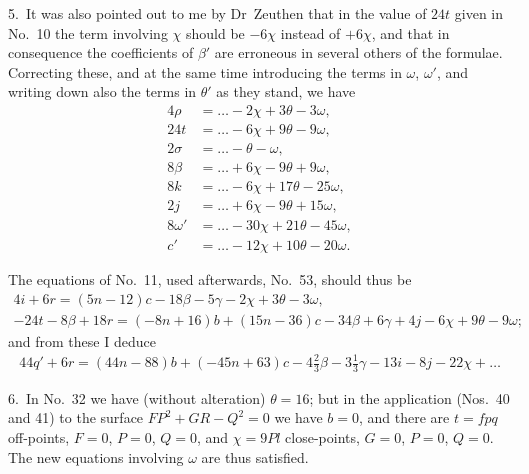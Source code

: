 \documentclass[11pt,a4paper]{article}
\theoremstyle{plain}
\theoremstyle{definition}
\theoremstyle{remark}
\begin{document}
5.\ It was also pointed out to me by Dr~Zeuthen that in the value of $24t$ given in No.~10 the term involving $\chi$ should be $-6\chi$ instead of $+6\chi$, and that in consequence the coefficients of $\beta'$ are erroneous in several others of the formulae. Correcting these, and at the same time introducing the terms in $\omega$, $\omega'$, and writing down also the terms in $\theta'$ as they stand, we have
\begin{align*}
4\rho &= \ldots-2\chi+3\theta-3\omega,\\
24t &= \ldots-6\chi+9\theta-9\omega,\\
2\sigma &= \ldots-\theta-\omega,\\
8\beta &= \ldots+6\chi-9\theta+9\omega,\\
8k &= \ldots-6\chi+17\theta-25\omega,\\
2j &= \ldots+6\chi-9\theta+15\omega,\\
8\omega' &= \ldots-30\chi+21\theta-45\omega,\\
c' &= \ldots-12\chi+10\theta-20\omega.
\end{align*}

The equations of No.~11, used afterwards, No.~53, should thus be
\begin{multline*}
4i+6r=(5n-12)c-18\beta-5\gamma-2\chi+3\theta-3\omega,\\
-24t-8\beta+18r=(-8n+16)b+(15n-36)c-34\beta+6\gamma+4j-6\chi+9\theta-9\omega;
\end{multline*}
and from these I deduce
\begin{multline*}
44q'+6r=(44n-88)b+(-45n+63)c-4\tfrac{2}{3}\beta-3\tfrac{1}{3}\gamma-13i-8j-22\chi+\ldots
\end{multline*}

6.\ In No.~32 we have (without alteration) $\theta=16$; but in the application (Nos.~40 and 41) to the surface $FP^2+GR-Q^2=0$ we have $b=0$, and there are $t=fpq$ off-points, $F=0$, $P=0$, $Q=0$, and $\chi=9Pl$ close-points, $G=0$, $P=0$, $Q=0$. The new equations involving $\omega$ are thus satisfied.
\end{document}
